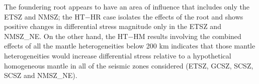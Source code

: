 \documentclass[draft,linenumbers]{agujournal2018}
\begin{document}
    The foundering root appears to have an area of influence that includes only the ETSZ and NMSZ; the HT$-$HR case isolates the effects of the root and shows positive changes in differential stress magnitude only in the ETSZ and NMSZ\_NE. On the other hand, the HT$-$HM results involving the combined effects of all the mantle heterogeneities below 200 km indicates that those mantle heterogeneities would increase differential stress relative to a hypothetical homogeneous mantle in all of the seismic zones considered (ETSZ, GCSZ, SCSZ, SCSZ and NMSZ\_NE). 
    
    
\end{document}
